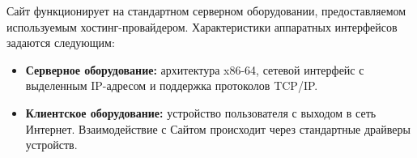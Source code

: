 
Сайт функционирует на стандартном серверном оборудовании, предоставляемом используемым хостинг-провайдером. Характеристики аппаратных интерфейсов задаются следующим:

\begin{itemize}
    \item \textbf{Серверное оборудование:} архитектура x86-64, сетевой интерфейс с выделенным IP-адресом и поддержка протоколов TCP/IP.
    \item \textbf{Клиентское оборудование:} устройство пользователя с выходом в сеть Интернет. Взаимодействие с Сайтом происходит через стандартные драйверы устройств.
\end{itemize}